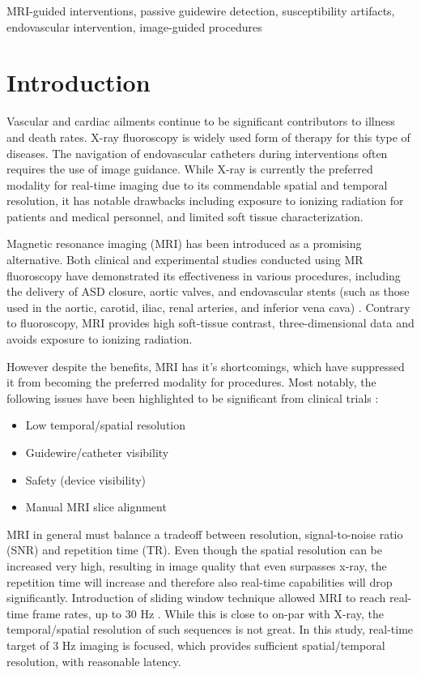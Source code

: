 \documentclass[conference]{IEEEtran}
\begin{document}
\begin{IEEEkeywords}
MRI-guided interventions, passive guidewire detection, susceptibility artifacts, endovascular intervention, image-guided procedures
\end{IEEEkeywords}

\section{Introduction}
Vascular and cardiac ailments continue to be significant contributors to illness and death rates. X-ray fluoroscopy is widely used form of therapy for this type of diseases. The navigation of endovascular catheters during interventions often requires the use of image guidance. While X-ray is currently the preferred modality for real-time imaging due to its commendable spatial and temporal resolution, it has notable drawbacks including exposure to ionizing radiation for patients and medical personnel, and limited soft tissue characterization.

Magnetic resonance imaging (MRI) has been introduced as a promising alternative. Both clinical and experimental studies conducted using MR fluoroscopy have demonstrated its effectiveness in various procedures, including the delivery of ASD closure, aortic valves, and endovascular stents (such as those used in the aortic, carotid, iliac, renal arteries, and inferior vena cava) \cite{pmid21359519}. Contrary to fluoroscopy, MRI provides high soft-tissue contrast, three-dimensional data and avoids exposure to ionizing radiation. 

However despite the benefits, MRI has it's shortcomings, which have suppressed it from becoming the preferred modality for procedures. Most notably, the following issues have been highlighted to be significant from clinical trials \cite{pmid35420239}:
\begin{itemize}
    \item Low temporal/spatial resolution
    \item Guidewire/catheter visibility
    \item Safety (device visibility)
    \item Manual MRI slice alignment
\end{itemize}
MRI in general must balance a tradeoff between resolution, signal-to-noise ratio (SNR) and repetition time (TR). Even though the spatial resolution can be increased very high, resulting in image quality that even surpasses x-ray, the repetition time will increase and therefore also real-time capabilities will drop significantly. Introduction of sliding window technique allowed MRI to reach real-time frame rates, up to 30 Hz \cite{pmid3173063}. While this is close to on-par with X-ray, the temporal/spatial resolution of such sequences is not great. In this study, real-time target of 3 Hz imaging is focused, which provides sufficient spatial/temporal resolution, with reasonable latency. 
\end{document}
